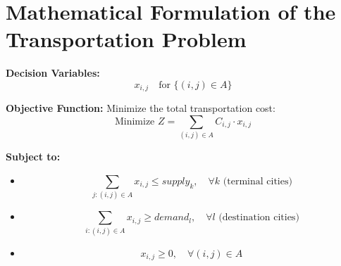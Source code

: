 \documentclass{article}
\begin{document}
\section*{Mathematical Formulation of the Transportation Problem}

\textbf{Decision Variables:}
\[
x_{i,j} \quad \text{for } \{(i,j) \in A\}
\]

\textbf{Objective Function:}
Minimize the total transportation cost:
\[
\text{Minimize } Z = \sum_{(i,j) \in A} C_{i,j} \cdot x_{i,j}
\]

\textbf{Subject to:}

\begin{itemize}
    \item {}
    \[
    \sum_{j: (i,j) \in A} x_{i,j} \leq supply_{k}, \quad \forall k \text{ (terminal cities)}
    \]
    \item {}
    \[
    \sum_{i: (i,j) \in A} x_{i,j} \geq demand_{l}, \quad \forall l \text{ (destination cities)}
    \]
    \item {}
    \[
    x_{i,j} \geq 0, \quad \forall (i,j) \in A
    \]
\end{itemize}
\end{document}
